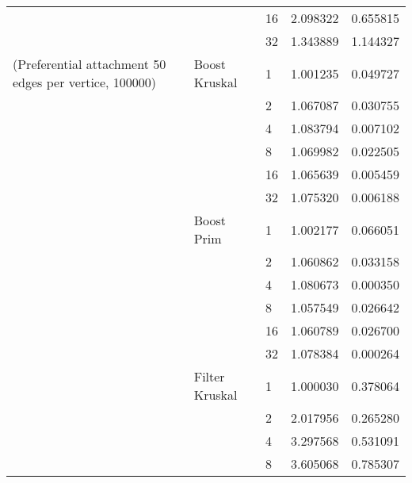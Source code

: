 \begin{tabular}{lllrr}
                                                       &                     & 16 &  2.098322 &  0.655815 \\
                                                       &                     & 32 &  1.343889 &  1.144327 \\
(Preferential attachment 50 edges per vertice, 100000) & Boost Kruskal & 1  &  1.001235 &  0.049727 \\
                                                       &                     & 2  &  1.067087 &  0.030755 \\
                                                       &                     & 4  &  1.083794 &  0.007102 \\
                                                       &                     & 8  &  1.069982 &  0.022505 \\
                                                       &                     & 16 &  1.065639 &  0.005459 \\
                                                       &                     & 32 &  1.075320 &  0.006188 \\
                                                       & Boost Prim & 1  &  1.002177 &  0.066051 \\
                                                       &                     & 2  &  1.060862 &  0.033158 \\
                                                       &                     & 4  &  1.080673 &  0.000350 \\
                                                       &                     & 8  &  1.057549 &  0.026642 \\
                                                       &                     & 16 &  1.060789 &  0.026700 \\
                                                       &                     & 32 &  1.078384 &  0.000264 \\
                                                       & Filter Kruskal & 1  &  1.000030 &  0.378064 \\
                                                       &                     & 2  &  2.017956 &  0.265280 \\
                                                       &                     & 4  &  3.297568 &  0.531091 \\
                                                       &                     & 8  &  3.605068 &  0.785307 \\

\end{tabular}
